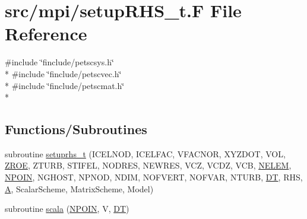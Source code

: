 \hypertarget{mpi_2setup_r_h_s__t_8_f}{\section{src/mpi/setup\-R\-H\-S\-\_\-t.F File Reference}
\label{mpi_2setup_r_h_s__t_8_f}
}
{\ttfamily \#include \char`\"{}finclude/petscsys.\-h\char`\"{}}\\*
{\ttfamily \#include \char`\"{}finclude/petscvec.\-h\char`\"{}}\\*
{\ttfamily \#include \char`\"{}finclude/petscmat.\-h\char`\"{}}\\*
\subsection*{Functions/\-Subroutines}
\begin{DoxyCompactItemize}
\item 
subroutine \hyperlink{mpi_2setup_r_h_s__t_8_f_a5ff19471b1236283e869ad2595608445}{setuprhs\-\_\-t} (I\-C\-E\-L\-N\-O\-D, I\-C\-E\-L\-F\-A\-C, V\-F\-A\-C\-N\-O\-R, X\-Y\-Z\-D\-O\-T, V\-O\-L, \hyperlink{myts_8com_a0c4fbcdb78e6b50c8919d714e4b5a694}{Z\-R\-O\-E}, Z\-T\-U\-R\-B, S\-T\-I\-F\-E\-L, N\-O\-D\-R\-E\-S, N\-E\-W\-R\-E\-S, V\-C\-Z, V\-C\-D\-Z, V\-C\-B, \hyperlink{mesh_8com_aee5e75b79d0e815c0603cfbccc618957}{N\-E\-L\-E\-M}, \hyperlink{mesh_8com_ae28c1572321efcd8715b974d87d20c58}{N\-P\-O\-I\-N}, N\-G\-H\-O\-S\-T, N\-P\-N\-O\-D, N\-D\-I\-M, N\-O\-F\-V\-E\-R\-T, N\-O\-F\-V\-A\-R, N\-T\-U\-R\-B, \hyperlink{myts_8com_a41549d5ede5e2b840495daf35608da41}{D\-T}, R\-H\-S, \hyperlink{ibc2_8com_ad2108d58343608772fff791c23da58f5}{A}, Scalar\-Scheme, Matrix\-Scheme, Model)
\item 
subroutine \hyperlink{mpi_2setup_r_h_s__t_8_f_ae9aba4ae2061b9d88fba7e0ceee69dd7}{scala} (\hyperlink{mesh_8com_ae28c1572321efcd8715b974d87d20c58}{N\-P\-O\-I\-N}, V, \hyperlink{myts_8com_a41549d5ede5e2b840495daf35608da41}{D\-T})
\end{DoxyCompactItemize}


